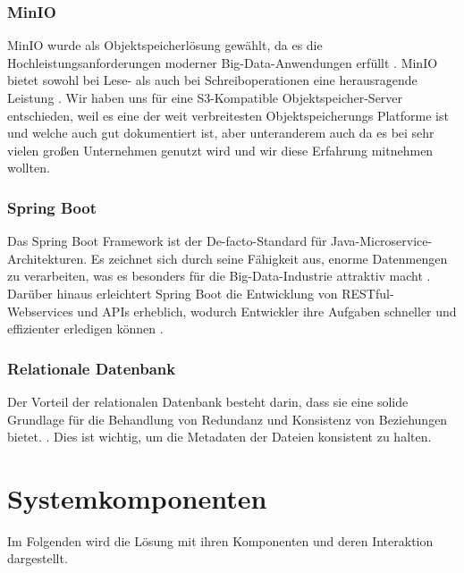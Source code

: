\documentclass[12pt]{report}
\begin{document}
			\subsubsection{MinIO}
			MinIO wurde als Objektspeicherlösung gewählt, da es die Hochleistungsanforderungen moderner Big-Data-Anwendungen erfüllt \cite{makris2022performance}. MinIO bietet sowohl bei Lese- als auch bei Schreiboperationen eine herausragende Leistung \cite{makris2022performance}. Wir haben uns für eine S3-Kompatible Objektspeicher-Server entschieden, weil es eine der weit verbreitesten Objektspeicherungs Platforme ist und welche auch gut dokumentiert ist, aber unteranderem auch da es bei sehr vielen großen Unternehmen genutzt wird und wir diese Erfahrung mitnehmen wollten.
			
			\subsubsection{Spring Boot}
			Das Spring Boot Framework ist der De-facto-Standard für Java-Microservice-Architekturen. Es zeichnet sich durch seine Fähigkeit aus, enorme Datenmengen zu verarbeiten, was es besonders für die Big-Data-Industrie attraktiv macht \cite{mythily2022analysis}. Darüber hinaus erleichtert Spring Boot die Entwicklung von RESTful-Webservices und APIs erheblich, wodurch Entwickler ihre Aufgaben schneller und effizienter erledigen können \cite{mythily2022analysis}.
			
			\subsubsection{Relationale Datenbank}
			Der Vorteil der relationalen Datenbank besteht darin, dass sie eine solide Grundlage für die Behandlung von Redundanz und Konsistenz von Beziehungen bietet. \cite{codd1970relational}. Dies ist wichtig, um die Metadaten der Dateien konsistent zu halten. 
			
	\section{Systemkomponenten}
		Im Folgenden wird die Lösung mit ihren Komponenten und deren Interaktion dargestellt.
\end{document}
